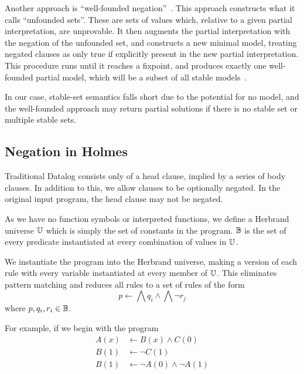 Another approach is ``well-founded negation''~\cite{wellfounded}.
This approach constructs what it calls ``unfounded sets''.
These are sets of values which, relative to a given partial interpretation, are unprovable.
It then augments the partial interpretation with the negation of the unfounded set, and constructs a new minimal model, treating negated clauses as only true if explicitly present in the new partial interpretation.
This procedure runs until it reaches a fixpoint, and produces exactly one well-founded partial model, which will be a subset of all stable models~\cite{wellfounded}.

In our case, stable-set semantics falls short due to the potential for no model, and the well-founded approach may return partial solutions if there is no stable set or multiple stable sets.
\subsection{Negation in Holmes}
Traditional Datalog consists only of a head clause, implied by a series of body clauses.
In addition to this, we allow clauses to be optionally negated.
In the original input program, the head clause may not be negated.

As we have no function symbols or interpreted functions, we define a Herbrand universe $\mathbb{U}$ which is simply the set of constants in the program.
$\mathbb{B}$ is the set of every predicate instantiated at every combination of values in $\mathbb{U}$.

We instantiate the program into the Herbrand universe, making a version of each rule with every variable instantiated at every member of $\mathbb{U}$.
This eliminates pattern matching and reduces all rules to a set of rules of the form
\[
	p \leftarrow \bigwedge q_i \wedge \bigwedge \neg r_j
\]
where $p, q_i, r_i \in \mathbb{B}$.

For example, if we begin with the program
\begin{align*}
A(x) &\leftarrow B(x) \wedge C(0)\\
B(1) &\leftarrow \neg C(1)\\
B(1) &\leftarrow \neg A(0) \wedge \neg A(1)
\end{align*}

